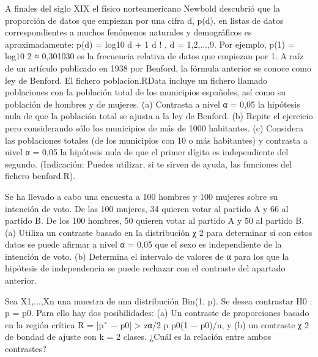 \begin{problem}[9] A finales del siglo XIX el físico norteamericano Newbold descubrió que la proporción de datos
que empiezan por una cifra d, p(d), en listas de datos correspondientes a muchos fenómenos
naturales y demográficos es aproximadamente:
p(d) = log10
d + 1
d
!
, d = 1,2,...,9.
Por ejemplo, p(1) = log10 2 ≈ 0,301030 es la frecuencia relativa de datos que empiezan por 1. A raíz
de un artículo publicado en 1938 por Benford, la fórmula anterior se conoce como ley de Benford.
El fichero poblacion.RData incluye un fichero llamado poblaciones con la población total de los
municipios españoles, así como su población de hombres y de mujeres.
(a) Contrasta a nivel α = 0,05 la hipótesis nula de que la población total se ajusta a la ley de Benford.
(b) Repite el ejercicio pero considerando sólo los municipios de más de 1000 habitantes.
(c) Considera las poblaciones totales (de los municipios con 10 o más habitantes) y contrasta a nivel
α = 0,05 la hipótesis nula de que el primer dígito es independiente del segundo.
(Indicación: Puedes utilizar, si te sirven de ayuda, las funciones del fichero benford.R).
\solution

\end{problem}
\begin{problem}[10] Se ha llevado a cabo una encuesta a 100 hombres y 100 mujeres sobre su intención de voto. De
las 100 mujeres, 34 quieren votar al partido A y 66 al partido B. De los 100 hombres, 50 quieren
votar al partido A y 50 al partido B.
(a) Utiliza un contraste basado en la distribución χ
2 para determinar si con estos datos se puede
afirmar a nivel α = 0,05 que el sexo es independiente de la intención de voto.
(b) Determina el intervalo de valores de α para los que la hipótesis de independencia se puede
rechazar con el contraste del apartado anterior.
\solution

\end{problem}
\begin{problem}[11] Sea X1,...,Xn una muestra de una distribución Bin(1, p). Se desea contrastar H0 : p = p0.
Para ello hay dos posibilidades: (a) Un contraste de proporciones basado en la región crítica
R = {|pˆ − p0| > zα/2
p
p0(1 − p0)/n}, y (b) un contraste χ
2 de bondad de ajuste con k = 2 clases. ¿Cuál
es la relación entre ambos contrastes?
\solution

\end{problem}
